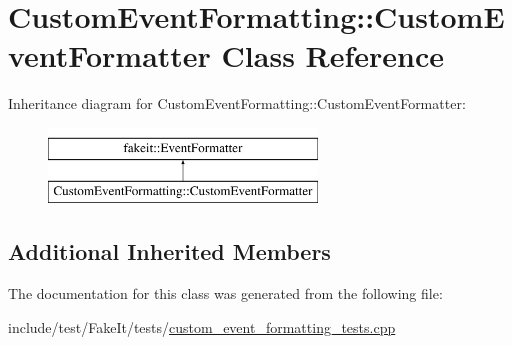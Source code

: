 \hypertarget{classCustomEventFormatting_1_1CustomEventFormatter}{}\section{Custom\+Event\+Formatting\+::Custom\+Event\+Formatter Class Reference}
\label{classCustomEventFormatting_1_1CustomEventFormatter}
Inheritance diagram for Custom\+Event\+Formatting\+::Custom\+Event\+Formatter\+:\begin{figure}[H]
\begin{center}
\leavevmode
\includegraphics[height=2.000000cm]{classCustomEventFormatting_1_1CustomEventFormatter}
\end{center}
\end{figure}
\subsection*{Additional Inherited Members}


The documentation for this class was generated from the following file\+:\begin{DoxyCompactItemize}
\item 
include/test/\+Fake\+It/tests/\mbox{\hyperlink{custom__event__formatting__tests_8cpp}{custom\+\_\+event\+\_\+formatting\+\_\+tests.\+cpp}}\end{DoxyCompactItemize}
